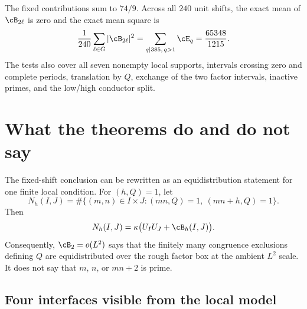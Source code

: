 The fixed contributions sum to $74/9$.  Across all $240$ unit shifts, the exact mean of $\cB_{2\ell}$ is zero and the exact mean square is
\begin{equation}\label{eq:Q385-complete-shift-energy}
 \frac1{240}\sum_{\ell\in G}|\cB_{2\ell}|^2
 =\sum_{q\mid385,\,q>1}\cE_q
 =\frac{65348}{1215}.
\end{equation}
The tests also cover all seven nonempty local supports, intervals crossing zero and complete periods, translation by $Q$, exchange of the two factor intervals, inactive primes, and the low/high conductor split.

\section{What the theorems do and do not say}\label{sec:boundaries}

The fixed-shift conclusion can be rewritten as an equidistribution statement for one finite local condition.  For $(h,Q)=1$, let
\[
 N_h(I,J)
 =\#\{(m,n)\in I\times J:(mn,Q)=1,\ (mn+h,Q)=1\}.
\]
Then
\begin{equation}\label{eq:local-count-relation}
 N_h(I,J)=\kappa\bigl(U_IU_J+\cB_h(I,J)\bigr).
\end{equation}
Consequently, $\cB_2=o(L^2)$ says that the finitely many congruence exclusions defining $Q$ are equidistributed over the rough factor box at the ambient $L^2$ scale.  It does not say that $m$, $n$, or $mn+2$ is prime.

\subsection{Four interfaces visible from the local model}

